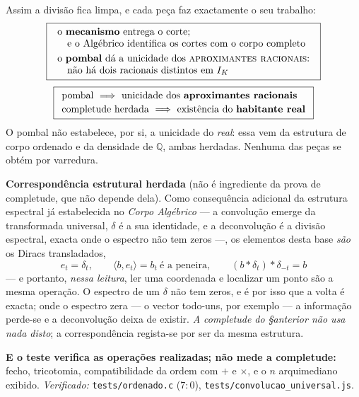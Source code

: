 \documentclass[11pt,a4paper]{article}
\newcommand{\code}[1]{\texttt{\small #1}}
\begin{document}
\medskip
\noindent Assim a divisão fica limpa, e cada peça faz exactamente o seu trabalho:
\[
\boxed{\;\begin{array}{l}
\text{o \textbf{mecanismo} entrega o corte;}\\
\quad\text{e o Algébrico identifica os cortes com o corpo completo}\\[3pt]
\text{o \textbf{pombal} dá a unicidade dos \textsc{aproximantes racionais}:}\\
\quad\text{não há dois racionais distintos em }I_K
\end{array}\;}
\]
\[
\boxed{
\begin{array}{l}
\text{pombal}\ \Longrightarrow\ \text{unicidade dos \textbf{aproximantes racionais}}\\[2pt]
\text{completude herdada}\ \Longrightarrow\ \text{existência do \textbf{habitante real}}
\end{array}}
\]
O pombal não estabelece, por si, a unicidade do \emph{real}: essa vem da estrutura
de corpo ordenado e da densidade de $\mathbb{Q}$, ambas herdadas. Nenhuma das
peças se obtém por varredura.

\medskip
\noindent\textbf{Correspondência estrutural herdada} (não é ingrediente da prova
de completude, que não depende dela). Como consequência adicional da estrutura
espectral já estabelecida no \emph{Corpo Algébrico} --- a convolução emerge da
transformada universal, $\delta$ é a sua identidade, e a deconvolução é a divisão
espectral, exacta onde o espectro não tem zeros ---, os elementos desta base
\emph{são} os Diracs transladados,
\[
\boxed{\;e_t=\delta_t,
\qquad \langle b,e_t\rangle=b_t\ \text{é a peneira},
\qquad (b\ast\delta_{t})\ast\delta_{-t}=b\;}
\]
--- e portanto, \emph{nessa leitura}, ler uma coordenada e localizar um ponto são
a mesma operação. O espectro de um $\delta$ não tem zeros, e é por isso que a
volta é exacta; onde o espectro zera --- o vector todo-uns, por exemplo --- a
informação perde-se e a deconvolução deixa de existir. \emph{A completude do
\S anterior não usa nada disto}; a correspondência regista-se por ser da mesma
estrutura.

\medskip
\noindent\textbf{E o teste verifica as operações realizadas; não mede a
completude:}
fecho, tricotomia, compatibilidade da ordem com $+$ e $\times$, e o $n$
arquimediano exibido. \emph{Verificado:} \code{tests/ordenado.c} ($7{:}0$),
\code{tests/convolucao\_universal.js}.
\end{document}
